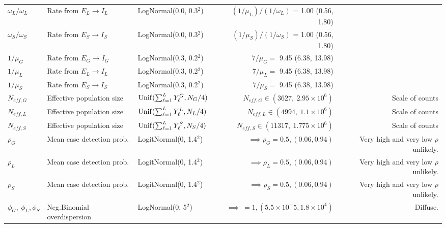 \begin{table}
\begin{fullpage}
\begin{tabular}{lllrr}
			$ \omega_L/\omega_L $ & Rate from $ E_L\rightarrow I_L $ & LogNormal(0.0, 0.3$ ^2 $) & $ (1/\mu_L)\big/(1/\omega_L) $ = 1.00 (0.56, 1.80) & \cite{chowell2014transmission,velasquez2015time,glynn2017variability} \\
			$ \omega_S/\omega_S $ & Rate from $ E_S\rightarrow I_S $ & LogNormal(0.0, 0.3$ ^2 $) & $ (1/\mu_S)\big/(1/\omega_S) $ = 1.00 (0.56, 1.80) & \cite{chowell2014transmission,velasquez2015time,glynn2017variability} \\
			$ 1/\mu_G $ & Rate from $ E_G\rightarrow I_G $ &  LogNormal(0.3, 0.2$ ^2 $) & $ 7/\mu_G = $ 9.45 (6.38, 13.98) & \cite{chowell2014transmission,velasquez2015time,glynn2017variability} \\
			$ 1/\mu_L $ & Rate from $ E_L\rightarrow I_L $ &  LogNormal(0.3, 0.2$ ^2 $) & $ 7/\mu_L = $ 9.45 (6.38, 13.98) & \cite{chowell2014transmission,velasquez2015time,glynn2017variability} \\
			$ 1/\mu_S $ & Rate from $ E_S\rightarrow I_S $ &  LogNormal(0.3, 0.2$ ^2 $) & $ 7/\mu_S = $ 9.45 (6.38, 13.98) & \cite{chowell2014transmission,velasquez2015time,glynn2017variability} \\
			$ N_{eff,G} $ & Effective population size & $\mathrm{Unif}(\sum_{\ell=1}^{L}Y_\ell^G, N_G/4) $& $ N_{eff,G} \in (3627,\ 2.95\times10^6) $ & Scale of counts \\
			$ N_{eff,L} $ & Effective population size & $\mathrm{Unif}(\sum_{\ell=1}^{L}Y_\ell^L, N_L/4) $& $ N_{eff,L} \in (4994,\ 1.1\times10^6) $ & Scale of counts \\
			$ N_{eff,S} $ & Effective population size & $\mathrm{Unif}(\sum_{\ell=1}^{L}Y_\ell^S, N_S/4) $& $ N_{eff,S} \in (11317,\ 1.775\times10^6) $ & Scale of counts \\
			$ \rho_G $ &  Mean case detection prob. & LogitNormal(0, 1.4$ ^2 $) & $ \implies \rho_G = 0.5, (0.06, 0.94)$ & Very high and very low $ \rho $ unlikely. \\
			$ \rho_L $ &  Mean case detection prob. & LogitNormal(0, 1.4$ ^2 $) & $ \implies \rho_L = 0.5, (0.06, 0.94)$ & Very high and very low $ \rho $ unlikely. \\
			$ \rho_S $ & Mean case detection prob. & LogitNormal(0, 1.4$ ^2 $) & $ \implies \rho_S = 0.5, (0.06, 0.94)$ & Very high and very low $ \rho $ unlikely. \\
			$ \phi_G,\ \phi_L, \phi_S $ &  Neg.Binomial overdispersion & LogNormal(0, 5$ ^2 $) & $ \implies \ = 1, (5.5\times 10^-5, 1.8\times10^4)$ & Diffuse. \\
			\hline
		\end{tabular}
	\end{fullpage}
\end{table}


